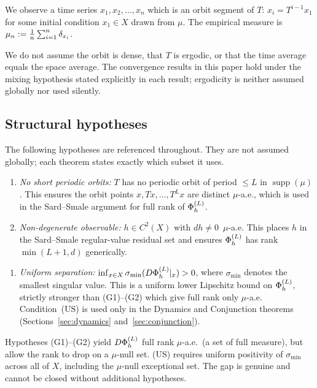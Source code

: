 We observe a time series $x_1, x_2, \ldots, x_n$ which is an orbit segment of
$T$: $x_i = T^{i-1}x_1$ for some initial condition $x_1 \in X$ drawn from
$\mu$.
The empirical measure is $\mu_n := \frac{1}{n}\sum_{i=1}^n \delta_{x_i}$.

\begin{remark}
We do not assume the orbit is dense, that $T$ is ergodic, or that the time
average equals the space average.
The convergence results in this paper hold under the mixing hypothesis stated
explicitly in each result; ergodicity is neither assumed globally nor used
silently.
\end{remark}

\subsection{Structural hypotheses}

The following hypotheses are referenced throughout.
They are not assumed globally; each theorem states exactly which subset it uses.

\begin{enumerate}[label=(G\arabic*)]
  \item \emph{No short periodic orbits:}
    $T$ has no periodic orbit of period $\leq L$ in $\operatorname{supp}(\mu)$.
    This ensures the orbit points $x, Tx, \ldots, T^L x$ are distinct
    $\mu$-a.e., which is used in the Sard--Smale argument for full rank of
    $\Phi_h^{(L)}$.

  \item \emph{Non-degenerate observable:}
    $h \in C^2(X)$ with $dh \neq 0$~$\mu$-a.e.
    This places $h$ in the Sard--Smale regular-value residual set and
    ensures $\Phi_h^{(L)}$ has rank $\min(L+1,d)$ generically.
\end{enumerate}

\begin{enumerate}[label=(US)]
  \item \emph{Uniform separation:}
    $\inf_{x \in X} \sigma_{\min}(D\Phi_h^{(L)}|_x) > 0$,
    where $\sigma_{\min}$ denotes the smallest singular value.
    This is a uniform lower Lipschitz bound on $\Phi_h^{(L)}$, strictly stronger than
    (G1)--(G2) which give full rank only $\mu$-a.e.
    Condition~(US) is used only in the Dynamics and Conjunction theorems
    (Sections~\ref{sec:dynamics} and~\ref{sec:conjunction}).
\end{enumerate}

\begin{remark}
Hypotheses (G1)--(G2) yield $D\Phi_h^{(L)}$ full rank $\mu$-a.e.\ (a set of full
measure), but allow the rank to drop on a $\mu$-null set.
(US) requires uniform positivity of $\sigma_{\min}$ across all of $X$,
including the $\mu$-null exceptional set.
The gap is genuine and cannot be closed without additional hypotheses.
\end{remark}

